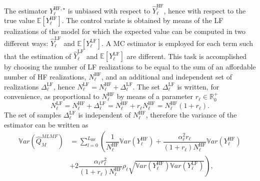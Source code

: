 The estimator $Y^{\mathrm{HF},\star}_{\ell}$ is unbiased with respect to $\hat{Y}^{\mathrm{HF}}_{\ell}$, hence with 
respect to the true value $\mathbb{E}\left[Y^{\mathrm{HF}}_{\ell}\right]$.
The control variate is obtained by means of the LF realizations of the model for which the expected value can be 
computed in two different ways: $\hat{Y}^{\mathrm{LF}}_{\ell}$ and $\mathbb{E}\left[Y^{\mathrm{LF}}_{\ell}\right]$. 
A MC estimator is employed for each term such that the estimation of $\hat{Y}^{\mathrm{LF}}_{\ell}$ and 
$\mathbb{E}\left[Y^{\mathrm{LF}}_{\ell}\right]$ are different. This task is accomplished by choosing the number of 
LF realizations to be equal to the sum of an affordable number of HF realizations, $N_{\ell}^{\mathrm{HF}}$, and 
an additional and independent set of realizations $\Delta_{\ell}^{\mathrm{LF}}$, 
hence $N_{\ell}^{\mathrm{LF}} = N_{\ell}^{\mathrm{HF}} + \Delta_{\ell}^{\mathrm{LF}}$. The set $\Delta_{\ell}^{\mathrm{LF}}$ is
written, for convenience, as proportional to $N_{\ell}^{\mathrm{HF}}$ by means of a parameter $r_{\ell} \in \mathbb{R}^+_0$
\begin{equation}
 N_{\ell}^{\mathrm{LF}} = N_{\ell}^{\mathrm{HF}} + \Delta_{\ell}^{\mathrm{LF}} = N_{\ell}^{\mathrm{HF}} + r_{\ell} N_{\ell}^{\mathrm{HF}} 
                        = N_{\ell}^{\mathrm{HF}} (1 + r_{\ell}).
\end{equation}
The set of samples $\Delta_{\ell}^{\mathrm{LF}}$ is independent of $N_{\ell}^{\mathrm{HF}}$, therefore the variance of the 
estimator can be written as
\begin{equation}\label{EQ: MLMF mean}
\begin{split}
\mathbb{V}ar\left(\hat{Q}_M^{MLMF}\right) &= \sum_{l=0}^{L_{\mathrm{HF}}} \left( \dfrac{1}{N_{\ell}^{\mathrm{HF}}} \mathbb{V}ar\left(Y^{\mathrm{HF}}_{\ell}\right) 
                                          + \dfrac{\alpha_\ell^2 r_\ell}{(1+r_\ell) N_{\ell}^{\mathrm{HF}}} \mathbb{V}ar\left(Y^{\mathrm{HF}}_{\ell}\right) \right. \\
              &+  \left. 2 \dfrac{\alpha_\ell r_\ell^2}{(1+r_\ell) N_{\ell}^{\mathrm{HF}}} \rho_\ell \sqrt{ \mathbb{V}ar\left(Y^{\mathrm{HF}}_{\ell}\right) 
                                                                                                      \mathbb{V}ar\left(Y^{\mathrm{LF}}_{\ell}\right) } \right),
\end{split}
\end{equation}

